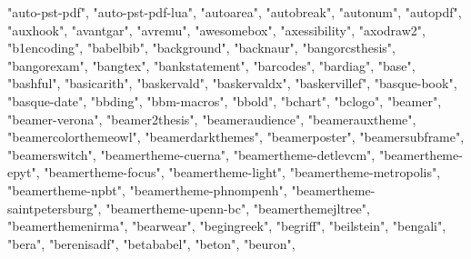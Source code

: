\documentclass[
]{article}
\newenvironment{Shaded}{\begin{snugshade}}{\end{snugshade}}
\newcommand{\NormalTok}[1]{#1}
\newcommand{\StringTok}[1]{\textcolor[rgb]{0.31,0.60,0.02}{#1}}
\begin{document}
\begin{Shaded}
\begin{Highlighting}[]
\StringTok{"auto{-}pst{-}pdf"}\NormalTok{, }\StringTok{"auto{-}pst{-}pdf{-}lua"}\NormalTok{, }\StringTok{"autoarea"}\NormalTok{, }\StringTok{"autobreak"}\NormalTok{, }
\StringTok{"autonum"}\NormalTok{, }\StringTok{"autopdf"}\NormalTok{, }\StringTok{"auxhook"}\NormalTok{, }\StringTok{"avantgar"}\NormalTok{, }\StringTok{"avremu"}\NormalTok{, }\StringTok{"awesomebox"}\NormalTok{, }
\StringTok{"axessibility"}\NormalTok{, }\StringTok{"axodraw2"}\NormalTok{, }\StringTok{"b1encoding"}\NormalTok{, }\StringTok{"babelbib"}\NormalTok{, }\StringTok{"background"}\NormalTok{, }
\StringTok{"backnaur"}\NormalTok{, }\StringTok{"bangorcsthesis"}\NormalTok{, }\StringTok{"bangorexam"}\NormalTok{, }\StringTok{"bangtex"}\NormalTok{, }\StringTok{"bankstatement"}\NormalTok{, }
\StringTok{"barcodes"}\NormalTok{, }\StringTok{"bardiag"}\NormalTok{, }\StringTok{"base"}\NormalTok{, }\StringTok{"bashful"}\NormalTok{, }\StringTok{"basicarith"}\NormalTok{, }\StringTok{"baskervald"}\NormalTok{, }
\StringTok{"baskervaldx"}\NormalTok{, }\StringTok{"baskervillef"}\NormalTok{, }\StringTok{"basque{-}book"}\NormalTok{, }\StringTok{"basque{-}date"}\NormalTok{, }
\StringTok{"bbding"}\NormalTok{, }\StringTok{"bbm{-}macros"}\NormalTok{, }\StringTok{"bbold"}\NormalTok{, }\StringTok{"bchart"}\NormalTok{, }\StringTok{"bclogo"}\NormalTok{, }\StringTok{"beamer"}\NormalTok{, }
\StringTok{"beamer{-}verona"}\NormalTok{, }\StringTok{"beamer2thesis"}\NormalTok{, }\StringTok{"beameraudience"}\NormalTok{, }\StringTok{"beamerauxtheme"}\NormalTok{, }
\StringTok{"beamercolorthemeowl"}\NormalTok{, }\StringTok{"beamerdarkthemes"}\NormalTok{, }\StringTok{"beamerposter"}\NormalTok{, }\StringTok{"beamersubframe"}\NormalTok{, }
\StringTok{"beamerswitch"}\NormalTok{, }\StringTok{"beamertheme{-}cuerna"}\NormalTok{, }\StringTok{"beamertheme{-}detlevcm"}\NormalTok{, }
\StringTok{"beamertheme{-}epyt"}\NormalTok{, }\StringTok{"beamertheme{-}focus"}\NormalTok{, }\StringTok{"beamertheme{-}light"}\NormalTok{, }
\StringTok{"beamertheme{-}metropolis"}\NormalTok{, }\StringTok{"beamertheme{-}npbt"}\NormalTok{, }\StringTok{"beamertheme{-}phnompenh"}\NormalTok{, }
\StringTok{"beamertheme{-}saintpetersburg"}\NormalTok{, }\StringTok{"beamertheme{-}upenn{-}bc"}\NormalTok{, }\StringTok{"beamerthemejltree"}\NormalTok{, }
\StringTok{"beamerthemenirma"}\NormalTok{, }\StringTok{"bearwear"}\NormalTok{, }\StringTok{"begingreek"}\NormalTok{, }\StringTok{"begriff"}\NormalTok{, }\StringTok{"beilstein"}\NormalTok{, }
\StringTok{"bengali"}\NormalTok{, }\StringTok{"bera"}\NormalTok{, }\StringTok{"berenisadf"}\NormalTok{, }\StringTok{"betababel"}\NormalTok{, }\StringTok{"beton"}\NormalTok{, }\StringTok{"beuron"}\NormalTok{, }

\end{Highlighting}
\end{Shaded}
\end{document}
